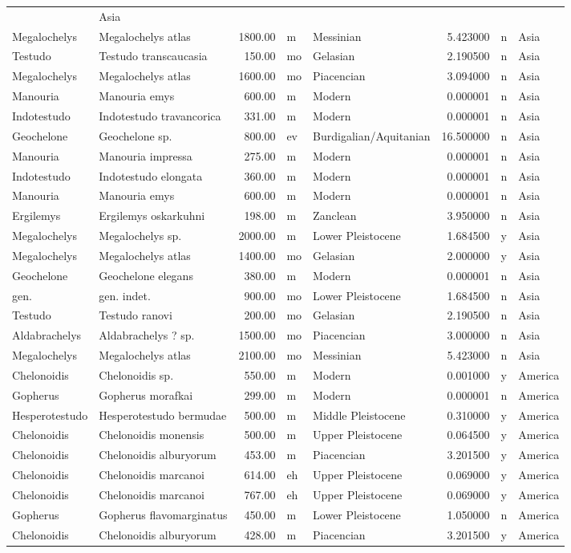 \begin{landscape}
\begin{longtable}[]{@{}llrllrll@{}}
	& Asia\tabularnewline
	Megalochelys & Megalochelys atlas & 1800.00 & m & Messinian & 5.423000 &
	n & Asia\tabularnewline
	Testudo & Testudo transcaucasia & 150.00 & mo & Gelasian & 2.190500 & n
	& Asia\tabularnewline
	Megalochelys & Megalochelys atlas & 1600.00 & mo & Piacencian & 3.094000
	& n & Asia\tabularnewline
	Manouria & Manouria emys & 600.00 & m & Modern & 0.000001 & n &
	Asia\tabularnewline
	Indotestudo & Indotestudo travancorica & 331.00 & m & Modern & 0.000001
	& n & Asia\tabularnewline
	Geochelone & Geochelone sp. & 800.00 & ev & Burdigalian/Aquitanian &
	16.500000 & n & Asia\tabularnewline
	Manouria & Manouria impressa & 275.00 & m & Modern & 0.000001 & n &
	Asia\tabularnewline
	Indotestudo & Indotestudo elongata & 360.00 & m & Modern & 0.000001 & n
	& Asia\tabularnewline
	Manouria & Manouria emys & 600.00 & m & Modern & 0.000001 & n &
	Asia\tabularnewline
	Ergilemys & Ergilemys oskarkuhni & 198.00 & m & Zanclean & 3.950000 & n
	& Asia\tabularnewline
	Megalochelys & Megalochelys sp. & 2000.00 & m & Lower Pleistocene &
	1.684500 & y & Asia\tabularnewline
	Megalochelys & Megalochelys atlas & 1400.00 & mo & Gelasian & 2.000000 &
	y & Asia\tabularnewline
	Geochelone & Geochelone elegans & 380.00 & m & Modern & 0.000001 & n &
	Asia\tabularnewline
	gen. & gen. indet. & 900.00 & mo & Lower Pleistocene & 1.684500 & n &
	Asia\tabularnewline
	Testudo & Testudo ranovi & 200.00 & mo & Gelasian & 2.190500 & n &
	Asia\tabularnewline
	Aldabrachelys & Aldabrachelys ? sp. & 1500.00 & mo & Piacencian &
	3.000000 & n & Asia\tabularnewline
	Megalochelys & Megalochelys atlas & 2100.00 & mo & Messinian & 5.423000
	& n & Asia\tabularnewline
	Chelonoidis & Chelonoidis sp. & 550.00 & m & Modern & 0.001000 & y &
	America\tabularnewline
	Gopherus & Gopherus morafkai & 299.00 & m & Modern & 0.000001 & n &
	America\tabularnewline
	Hesperotestudo & Hesperotestudo bermudae & 500.00 & m & Middle
	Pleistocene & 0.310000 & y & America\tabularnewline
	Chelonoidis & Chelonoidis monensis & 500.00 & m & Upper Pleistocene &
	0.064500 & y & America\tabularnewline
	Chelonoidis & Chelonoidis alburyorum & 453.00 & m & Piacencian &
	3.201500 & y & America\tabularnewline
	Chelonoidis & Chelonoidis marcanoi & 614.00 & eh & Upper Pleistocene &
	0.069000 & y & America\tabularnewline
	Chelonoidis & Chelonoidis marcanoi & 767.00 & eh & Upper Pleistocene &
	0.069000 & y & America\tabularnewline
	Gopherus & Gopherus flavomarginatus & 450.00 & m & Lower Pleistocene &
	1.050000 & n & America\tabularnewline
	Chelonoidis & Chelonoidis alburyorum & 428.00 & m & Piacencian &
	3.201500 & y & America\tabularnewline

\end{longtable}
\end{landscape}
